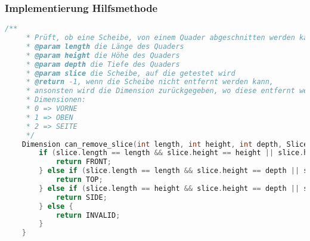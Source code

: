 \documentclass[a4paper,10pt,ngerman]{scrartcl}
\begin{document}
    \subsubsection{Implementierung Hilfsmethode}
    \begin{lstlisting}[frame=single,language=C++,title=Methode can\_remove\_slice,breaklines=true,label={lst:code_canRemoveSlice}]
    /**
     * Prüft, ob eine Scheibe, von einem Quader abgeschnitten werden kann
     * @param length die Länge des Quaders
     * @param height die Höhe des Quaders
     * @param depth die Tiefe des Quaders
     * @param slice die Scheibe, auf die getestet wird
     * @return -1, wenn die Scheibe nicht entfernt werden kann,
     * ansonsten wird die Dimension zurückgegeben, wo diese entfernt werden kann
     * Dimensionen:
     * 0 => VORNE
     * 1 => OBEN
     * 2 => SEITE
     */
    Dimension can_remove_slice(int length, int height, int depth, Slice slice) {
        if (slice.length == length && slice.height == height || slice.height == length && slice.length == height) {
            return FRONT;
        } else if (slice.length == length && slice.height == depth || slice.height == length && slice.length == depth) {
            return TOP;
        } else if (slice.length == height && slice.height == depth || slice.height == height && slice.length == depth) {
            return SIDE;
        } else {
            return INVALID;
        }
    }
    \end{lstlisting}

    \newpage
\end{document}
